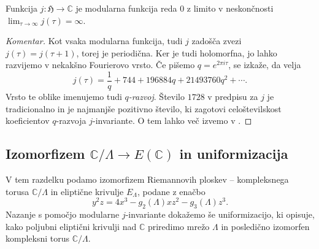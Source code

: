 \documentclass[mat1]{fmfdelo}
\numberwithin{equation}{section}
\newcommand{\C}{\mathbb C}
\newcommand{\HH}{\mathfrak{H}}
\newcommand{\Lattice}{\mathscr{L}}
\newcommand{\CM}{\mathbb C ^*}
\newcommand{\om}{\omega}
\newcommand{\inv}{^{-1}}
\newcommand{\torus}{\C/\Lambda}
\newcommand{\htp}{\simeq}
\renewcommand\Im{\operatorname{Im}}%
\theoremstyle{definition}
\newenvironment{komentar}[1][Komentar]{\begin{proof}[#1]\let\qed\relax}{\end{proof}}
\begin{document}
\begin{trditev}
    Funkcija $j : \HH \to \C$ je modularna funkcija reda $0$ z limito v neskončnosti $\lim_{\tau \to \infty}j(\tau) = \infty$.
\end{trditev}

\begin{komentar}
    Kot vsaka modularna funkcija, tudi $j$ zadošča zvezi $j(\tau) = j(\tau + 1)$, torej je periodična. Ker je tudi holomorfna, jo lahko razvijemo v nekakšno Fourierovo vrsto. Če pišemo $q = e^{2\pi i \tau}$, se izkaže, da velja
    \[
        j(\tau) = \frac{1}{q} + 744 + 196884q + 21493760q^2 + \cdots.
    \]
    Vrsto te oblike imenujemo tudi \emph{$q$-razvoj}. Število $1728$ v predpisu za $j$ je tradicionalno in je najmanjše pozitivno število, ki zagotovi celoštevilskost koeficientov $q$-razvoja $j$-invariante. O tem lahko več izvemo v \cite[VII, \S3]{Serre}.
\end{komentar}





\subsection{Izomorfizem \texorpdfstring{$\C/\Lambda \to E(\C)$ in uniformizacija}{}} 

V tem razdelku podamo izomorfizem Riemannovih ploskev -- kompleksnega torusa $\torus$ in eliptične krivulje $E_\Lambda$, podane z enačbo
\[
    y^2z = 4x^3 - g_2(\Lambda)xz^2 - g_3(\Lambda)z^3.
\]
Nazanje s pomočjo modularne $j$-invariante dokažemo še uniformizacijo, ki opisuje, kako poljubni eliptični krivulji nad $\C$ priredimo mrežo $\Lambda$ in posledično izomorfen kompleksni torus $\torus$.
\end{document}
